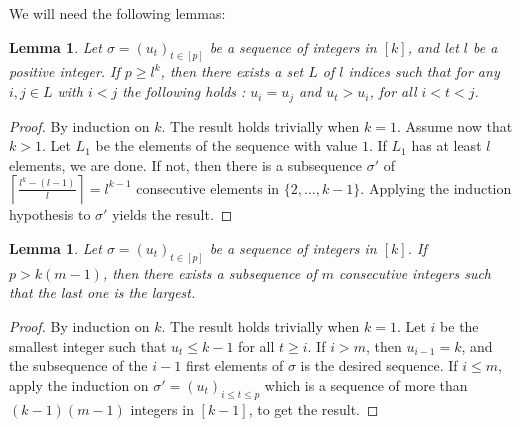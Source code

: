 \documentclass[utf8,10pt]{article}
\theoremstyle{plain}
\newtheorem{lemma}[theorem]{Lemma}
\theoremstyle{definition}
\theoremstyle{remark}
\begin{document}
We will need the following lemmas:

%
%

\begin{lemma}\label{min}
Let $\sigma=(u_t)_{t\in [p]}$ be a sequence of integers in $[k]$, and let $l$ be a positive integer. If $p\geq l^k$, then there exists a set $L$ of $l$ indices such that for any $i,j \in L$ with $i < j$ the following holds : $u_i=u_j$ and $u_t > u_i$, for all $i < t < j$. \end{lemma}

\begin{proof}
By induction on $k$. The result holds trivially when $k=1$. Assume now that $k>1$. Let $L_1$ be the elements of the sequence with value $1$. If $L_1$ has at least $l$ elements, we are done.
If not, then there is a subsequence $\sigma'$ of $\left\lceil \frac{l^k-(l-1)}{l}\right \rceil = l^{k-1}$ consecutive elements in $\{2, \dots , k-1\}$. Applying the induction hypothesis to $\sigma'$ yields the result.
\end{proof}

\begin{lemma}\label{max}
Let $\sigma=(u_t)_{t\in [p]}$ be a sequence of integers in $[k]$. 
If $p > k (m-1)$, then there exists a subsequence of $m$ consecutive integers such that the
last one is the largest.
\end{lemma}

\begin{proof}
By induction on $k$. The result holds trivially when $k=1$. 
Let $i$ be the smallest integer such that $u_t\leq k-1$ for all $t\geq i$.
If $i>m$, then $u_{i-1}=k$, and the subsequence of the $i-1$ first elements of $\sigma$ is the desired sequence.
If $i\leq m$, apply the induction on $\sigma'=(u_t)_{i\leq t\leq p}$ which is a sequence of more than $(k-1)(m-1)$ integers in $[k-1]$, to get the result. 
\end{proof}
\end{document}
